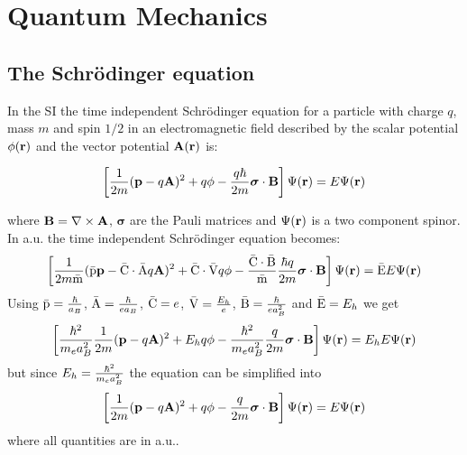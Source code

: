 \documentclass[12pt,a4paper,twoside]{report}
\begin{document}
{{\color{dark-blue}\chapter{Quantum Mechanics}}

{\color{coral}\section{The Schr\"odinger equation}}
\color{black}

In the SI the time independent Schr\"odinger equation for a particle 
with charge $q$, mass $m$ and spin $1/2$ in an electromagnetic field 
described by the scalar potential $\phi({\bf r})$ and the vector
potential ${\bf A}({\bf r})$ is:

\begin{tcolorbox}
\begin{equation}
\left[{1\over 2m} ({\bf p}-q {\bf A})^2 + q \phi - 
{q \hbar \over 2 m} {\boldsymbol \sigma} \cdot {\bf B} \right]
\Psi({\bf r})=E \Psi({\bf r})
\end{equation}
\end{tcolorbox}

where ${\bf B}=\nabla\times {\bf A}$, ${\boldsymbol \sigma}$ are the Pauli
matrices and $\Psi({\bf r})$ is a two component spinor.
\\

{\color{web-blue} In a.u. the time independent Schr\"odinger equation
becomes:
\begin{equation}
\left[{1\over 2m {\rm \bar m}} ({\rm \bar p} {\bf p}-{\rm \bar C}\cdot {\rm \bar A} q {\bf A})^2 + 
{\rm \bar C} \cdot {\rm \bar V} q \phi - 
{{\rm \bar C} \cdot {\rm \bar B} \over {\rm \bar m}} {\hbar q \over 2 m} 
{\boldsymbol \sigma} \cdot {\bf B} \right]
\Psi({\bf r})={\rm \bar E} E \Psi({\bf r})
\label{segen}
\end{equation}
Using ${\rm \bar p}={\hbar \over a_B}$, ${\rm \bar A}={\hbar \over e a_B}$, 
${\rm \bar C}=e$, ${\rm \bar V}= {E_h \over e}$, ${\rm \bar B}={\hbar \over e a_B^2}$ and
${\rm \bar E}=E_h$
we get
\begin{equation}
\left[{\hbar^2 \over m_e a_B^2} {1\over 2m} ({\bf p}-q {\bf A})^2 + 
E_h q \phi - {\hbar^2 \over m_e a_B^2} {q \over 2 m} 
{\boldsymbol \sigma} \cdot {\bf B} \right]
\Psi({\bf r})=E_h E \Psi({\bf r})
\end{equation}
but since $E_h= {\hbar^2 \over m_e a_B^2}$ the equation can be simplified into
\begin{equation}
\left[{1\over 2m} ({\bf p}-q {\bf A})^2 + 
q \phi - {q \over 2 m} 
{\boldsymbol \sigma} \cdot {\bf B} \right]
\Psi({\bf r})= E \Psi({\bf r})
\end{equation}
where all quantities are in a.u..\\

}}
\end{document}
